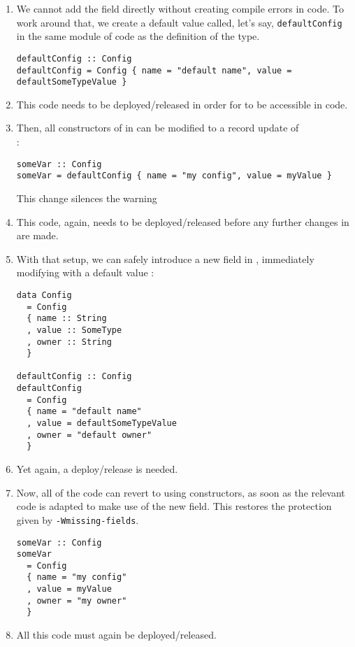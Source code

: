 \documentclass[en]{pracamgr}
\begin{document}
\begin{enumerate}
  \item We cannot add the field directly without creating compile errors in \user{} code. 
  To work around that, we create a default value called, let's say, \texttt{defaultConfig} in the same module of \infra{} code as 
  the definition of the type.\\
  \begin{minipage}{\linewidth}
    \begin{lstlisting}
defaultConfig :: Config
defaultConfig = Config { name = "default name", value = defaultSomeTypeValue }
    \end{lstlisting}
  \end{minipage}
  \item This code needs to be deployed/released in order for  to be accessible in \user{} code.
  \item Then, all constructors of \conf{} in \user{} can be modified to a record update of \\
  :\\
  \begin{minipage}{\linewidth}
    \begin{lstlisting}
someVar :: Config
someVar = defaultConfig { name = "my config", value = myValue }
    \end{lstlisting}
  \end{minipage}
  This change silences the warning 
  \item This code, again, needs to be deployed/released before any further changes in \infra{} are made.
  \item With that setup, we can safely introduce a new field in \infra{}, immediately modifying  with a default value :\\
  \begin{minipage}{\linewidth}
    \begin{lstlisting}
data Config 
  = Config
  { name :: String
  , value :: SomeType
  , owner :: String
  }

defaultConfig :: Config
defaultConfig 
  = Config 
  { name = "default name"
  , value = defaultSomeTypeValue
  , owner = "default owner" 
  }
    \end{lstlisting}
    \end{minipage}
  \item Yet again, a deploy/release is needed.
  \item Now, all of the \user{} code can revert to using constructors, as soon as the relevant code is adapted to make use of the 
  new field. This restores the protection given by \texttt{-Wmissing-fields}.\\
\begin{minipage}{\linewidth}
\begin{lstlisting}
someVar :: Config
someVar 
  = Config
  { name = "my config"
  , value = myValue
  , owner = "my owner"
  }
\end{lstlisting}
\end{minipage}

  \item All this \user{} code must again be deployed/released.
\end{enumerate}
\end{document}
